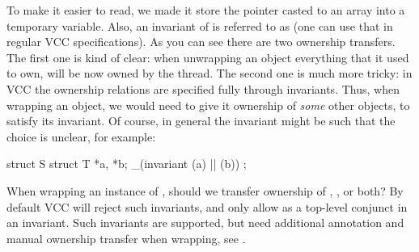 \noindent
To make it easier to read, we made it store the  pointer
casted to an array into a temporary variable.
Also, an invariant of  is referred to as 
(one can use that in regular VCC specifications).
As you can see there are two ownership transfers.
The first one is kind of clear: when unwrapping an object everything that it used
to own, will be now owned by the thread.
The second one is much more tricky: 
in VCC the ownership relations are specified fully through invariants.
Thus, when wrapping an object, we would need to give it ownership
of \emph{some} other objects, to satisfy its invariant.
Of course, in general the invariant might be such that the choice
is unclear, for example:
\begin{VCC}
struct S {
  struct T *a, *b;
  _(invariant \mine(a) || \mine(b))
};
\end{VCC}
When wrapping an instance of , should we transfer ownership of , , or both?
By default VCC will reject such invariants, and only allow 
as a top-level conjunct in an invariant.
Such invariants are supported, but need additional annotation
and manual ownership transfer when wrapping, see .


